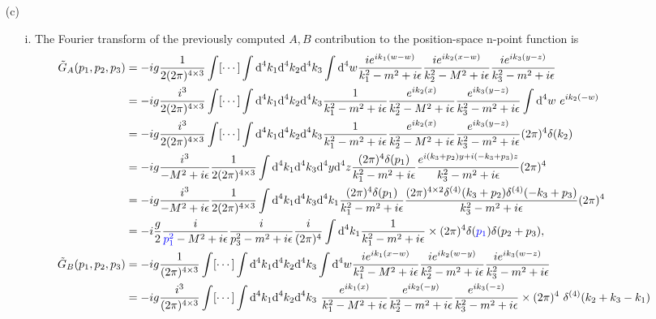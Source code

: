 \documentclass[10pt, a4paper]{article}
\begin{document}
\begin{enumerate}
\newpage
    \item[(c)]
    \begin{enumerate}
        \item[i.] The Fourier transform of the previously computed $A,B$ contribution to the position-space n-point function is 
        \footnotesize{
        \begin{align*}
            \tilde{G}_A(p_1, p_2, p_3) &= -ig\dfrac{1}{2(2\pi)^{4 \times 3}}\int [\cdots] \int  \text{d}^4k_1\text{d}^4k_2\text{d}^4k_3 \int \text{d}^4 w \dfrac{i e^{i k_1(w-w)}}{k_1^2 - m^2 +i\epsilon} \dfrac{i e^{i k_2(x-w)}}{k_2^2 - M^2 +i\epsilon} \dfrac{i e^{i k_3(y-z)}}{k_3^2 - m^2 +i\epsilon}\\
            &= -ig\dfrac{i^3}{2(2\pi)^{4 \times 3}}\int [\cdots]\int \text{d}^4k_1\text{d}^4k_2\text{d}^4k_3 \dfrac{1}{k_1^2 - m^2 +i\epsilon} \dfrac{e^{i k_2(x)}}{k_2^2 - M^2 +i\epsilon}\dfrac{e^{i k_3(y-z)}}{k_3^2 - m^2 +i\epsilon}\int \text{d}^4 w \ e^{i k_2(-w)}\\
            &= -ig\dfrac{i^3}{2(2\pi)^{4 \times 3}}\int [\cdots]\int \text{d}^4k_1\text{d}^4k_2\text{d}^4k_3 \dfrac{1}{k_1^2 - m^2 +i\epsilon} \dfrac{e^{i k_2(x)}}{k_2^2 - M^2 +i\epsilon}\dfrac{e^{i k_3(y-z)}}{k_3^2 - m^2 +i\epsilon} (2\pi)^4 \delta(k_2)\\
            &= -ig\dfrac{i^3}{- M^2 + i \epsilon}\dfrac{1}{2(2\pi)^{4 \times 3}}\int \text{d}^4k_1\text{d}^4k_3 \text{d}^4 y \text{d}^4 z \dfrac{(2\pi)^4\delta(p_1)}{k_1^2 - m^2 +i\epsilon} \dfrac{e^{i (k_3+p_2)y+i(-k_3+p_3)z}}{k_3^2 - m^2 +i\epsilon} (2\pi)^4\\
            &= -ig\dfrac{i^3}{- M^2 + i \epsilon}\dfrac{1}{2(2\pi)^{4 \times 3}}\int \text{d}^4k_1\text{d}^4k_3 \text{d}^4k_1 \dfrac{(2\pi)^4\delta(p_1)}{k_1^2 - m^2 +i\epsilon} \dfrac{(2\pi)^{4 \times 2}\delta^{(4)}(k_3+p_2)\delta^{(4)}(-k_3+p_3)}{k_3^2 - m^2 +i\epsilon} (2\pi)^4\\
            &=-i\dfrac{g}{2}\dfrac{i}{\textcolor{blue}{p_1^2}- M^2 + i \epsilon} \dfrac{i}{p_3^2 - m^2 +i\epsilon}  \dfrac{i}{(2\pi)^4}\int \text{d}^4 k_1 \dfrac{1}{k_1^2 - m^2 +i\epsilon} \times (2\pi)^4 \delta(\textcolor{blue}{p_1})\delta(p_2 + p_3),\\
            \tilde{G}_B(p_1, p_2, p_3) &= -ig\dfrac{1}{(2\pi)^{4 \times 3}}\int [\cdots]\int \text{d}^4k_1\text{d}^4k_2\text{d}^4k_3 \int \text{d}^4 w \dfrac{ie^{i k_1(x-w)}}{k_1^2 - M^2 +i\epsilon} \dfrac{ie^{i k_2(w-y)}}{k_2^2 - m^2 +i\epsilon} \dfrac{ie^{i k_3(w-z)}}{k_3^2 - m^2 +i\epsilon}\\
            &= -ig\dfrac{i^3}{(2\pi)^{4 \times 3}}\int [\cdots]\int \text{d}^4k_1\text{d}^4k_2\text{d}^4k_3 \ \dfrac{e^{i k_1(x)}}{k_1^2 - M^2 +i\epsilon} \dfrac{e^{i k_2(-y)}}{k_2^2 - m^2 +i\epsilon} \dfrac{e^{i k_3(-z)}}{k_3^2 - m^2 +i\epsilon}\times (2\pi)^4 \ \delta^{(4)}(k_2 + k_3 - k_1)\\

\end{align*}}
\end{enumerate}
\end{enumerate}
\end{document}
